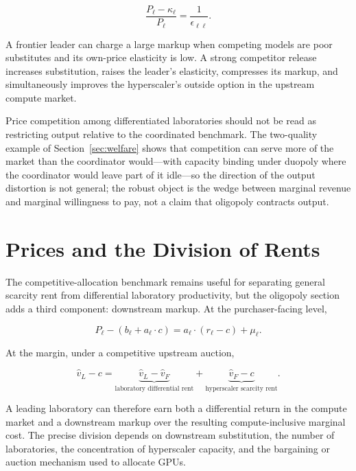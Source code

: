 \documentclass[11pt]{article}
\begin{document}
\begin{equation}\frac{P_\ell-\kappa_\ell}{P_\ell}=\frac{1}{\epsilon_{\ell\ell}}.\end{equation}

A frontier leader can charge a large markup when competing models are poor substitutes and its own-price elasticity is low. A strong competitor release increases substitution, raises the leader's elasticity, compresses its markup, and simultaneously improves the hyperscaler's outside option in the upstream compute market.

Price competition among differentiated laboratories should not be read as restricting output relative to the coordinated benchmark. The two-quality example of Section~\ref{sec:welfare} shows that competition can serve more of the market than the coordinator would---with capacity binding under duopoly where the coordinator would leave part of it idle---so the direction of the output distortion is not general; the robust object is the wedge between marginal revenue and marginal willingness to pay, not a claim that oligopoly contracts output.

\section{Prices and the Division of Rents}
\label{sec:prices-rents}

The competitive-allocation benchmark remains useful for separating general scarcity rent from differential laboratory productivity, but the oligopoly section adds a third component: downstream markup. At the purchaser-facing level,

\begin{equation}P_\ell-\left(b_\ell+a_\ell\cdot c\right)=a_\ell\cdot(r_\ell-c)+\mu_\ell.\end{equation}

At the margin, under a competitive upstream auction,

\begin{equation}\widehat v_L-c=\underbrace{\widehat v_L-\widehat v_F}_{\text{laboratory differential rent}}+\underbrace{\widehat v_F-c}_{\text{hyperscaler scarcity rent}}.\end{equation}

A leading laboratory can therefore earn both a differential return in the compute market and a downstream markup over the resulting compute-inclusive marginal cost. The precise division depends on downstream substitution, the number of laboratories, the concentration of hyperscaler capacity, and the bargaining or auction mechanism used to allocate GPUs.
\end{document}
